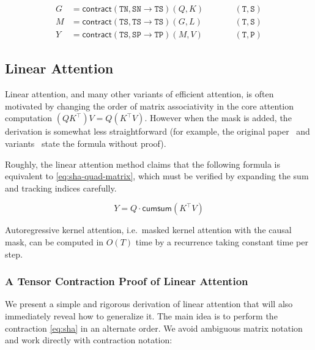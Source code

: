 \begin{subequations}
  \label{eq:sha-quad}
  \begin{align}
    \label{eq:sha-quad:1}
    G &= \mathsf{contract}(\mathtt{TN, SN} \to \mathtt{TS})(Q, K) && \qquad \mathtt{(T,S)} \\
    \label{eq:sha-quad:2}
    M &= \mathsf{contract}(\mathtt{TS, TS} \to \mathtt{TS})(G, L) && \qquad \mathtt{(T,S)} \\
    \label{eq:sha-quad:3}
    Y &= \mathsf{contract}(\mathtt{TS, SP} \to \mathtt{TP})(M, V) && \qquad \mathtt{(T,P)}
  \end{align}
\end{subequations}

\subsection{Linear Attention}
\label{sec:linear-attention}

Linear attention, and many other variants of efficient attention, is often motivated by changing the order of matrix associativity in the core attention computation $(QK^\top)V = Q(K^\top V)$. However when the mask is added, the derivation is somewhat less straightforward (for example, the original paper~\citep{katharopoulos2020transformers} and variants~\citep{sun2023retentive} state the formula without proof).

Roughly, the linear attention method claims that the following formula is equivalent to \eqref{eq:sha-quad-matrix}, which must be verified by expanding the sum and tracking indices carefully.

\begin{equation}
  \label{eq:sha-lin-matrix}
  Y = Q \cdot \mathsf{cumsum}(K^\top V)
\end{equation}

\begin{proposition}
  \label{prop:linear-attention}
  Autoregressive kernel attention, i.e.\ masked kernel attention with the causal mask, can be computed in $O(T)$ time by a recurrence taking constant time per step.
\end{proposition}

\subsubsection{A Tensor Contraction Proof of Linear Attention}

We present a simple and rigorous derivation of linear attention that will also immediately reveal how to generalize it. The main idea is to perform the contraction \eqref{eq:sha} in an alternate order. We avoid ambiguous matrix notation and work directly with contraction notation:

